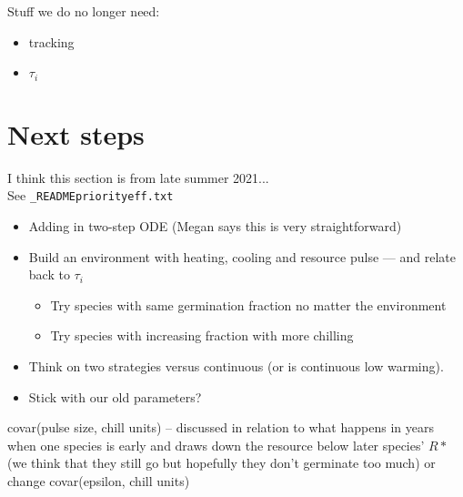 \documentclass[11pt,letter]{article}
\begin{document}
Stuff we do no longer need:\\
\begin{itemize}
\item tracking
\item $\tau_i$
\end{itemize}

\section{Next steps}
I think this section is from late summer 2021...\\

See \verb|_READMEpriorityeff.txt| 

\begin{itemize}
\item Adding in two-step ODE (Megan says this is very straightforward)
\item  Build an environment with heating, cooling and resource pulse — and relate back to $\tau_i$
\begin{itemize}
\item Try species with same germination fraction no matter the environment
\item Try species with increasing fraction with more chilling 
\end{itemize}
\item Think on two strategies versus continuous (or is continuous low warming).
\item Stick with our old parameters? 
\end{itemize}

covar(pulse size, chill units) -- discussed in relation to what happens in years when one species is early and draws down the resource below later species' $R*$ (we think that they still go but hopefully they don't germinate too much) or change covar(epsilon, chill units)\\
\end{document}
